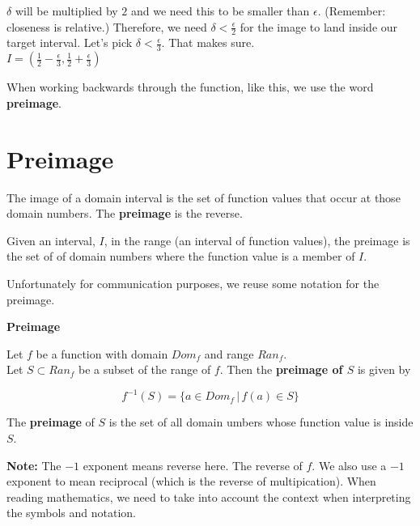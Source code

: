 \documentclass{ximera}
\begin{document}
$\delta$ will be multiplied by $2$ and we need this to be smaller than $\epsilon$.  (Remember: closeness is relative.) Therefore, we need $\delta < \frac{\epsilon}{2}$ for the image to land inside our target interval.  Let's pick $\delta < \frac{\epsilon}{3}$.  That makes sure. \\



$I = \left( \frac{1}{2} - \frac{\epsilon}{3}, \frac{1}{2} + \frac{\epsilon}{3} \right)$




When working backwards through the function, like this, we use the word \textbf{preimage}.



























\section{Preimage}




The image of a domain interval is the set of function values that occur at those domain numbers.  The \textbf{preimage} is the reverse.  

Given an interval, $I$, in the range (an interval of function values), the preimage is the set of of domain numbers where the function value is a member of $I$.

Unfortunately for communication purposes, we reuse some notation for the preimage.



\begin{definition} \textbf{\textcolor{green!50!black}{Preimage}}

Let $f$ be a function with domain $Dom_f$ and range $Ran_f$. \\
Let $S \subset Ran_f$ be a subset of the range of $f$.  Then the \textbf{preimage of $S$} is given by

\[       f^{-1}(S) = \{   a \in Dom_f  \, | \, f(a) \in S  \}             \]



The \textbf{preimage} of $S$ is the set of all domain umbers whose function value is inside $S$.


\textbf{Note:}  The $-1$ exponent means reverse here. The reverse of $f$.  We also use a $-1$ exponent to mean reciprocal (which is the reverse of multipication).  When reading mathematics, we need to take into account the context when interpreting the symbols and notation.


\end{definition}
\end{document}
